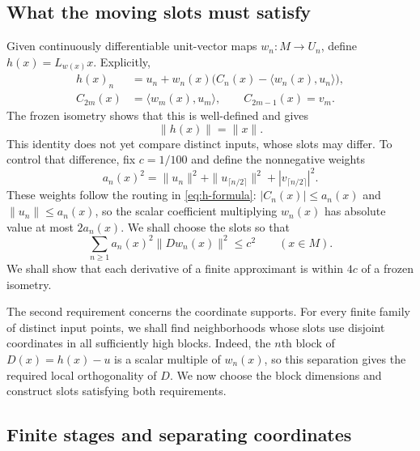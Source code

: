 \subsection{What the moving slots must satisfy}

Given continuously differentiable unit-vector maps $w_n:M\to U_n$,
define $h(x)=L_{w(x)}x$. Explicitly,
\begin{equation}
\label{eq:h-formula}
 \begin{split}
 h(x)_n&=u_n+w_n(x)\bigl(C_n(x)-\langle w_n(x),u_n\rangle\bigr),\\
 C_{2m}(x)&=\langle w_m(x),u_m\rangle,
 \qquad C_{2m-1}(x)=v_m.
 \end{split}
\end{equation}
The frozen isometry shows that this is well-defined and gives
\begin{equation}
\label{eq:pointwise-norm}
 \|h(x)\|=\|x\|.
\end{equation}
This identity does not yet compare distinct inputs, whose slots may
differ. To control that difference, fix $c=1/100$ and define the
nonnegative weights
\begin{equation}
\label{eq:weights-radii}
 a_n(x)^2=\|u_n\|^2+\|u_{\lceil n/2\rceil}\|^2
                         +|v_{\lceil n/2\rceil}|^2.
\end{equation}
These weights follow the routing in \eqref{eq:h-formula}:
$|C_n(x)|\le a_n(x)$ and $\|u_n\|\le a_n(x)$, so the scalar
coefficient multiplying $w_n(x)$ has absolute value at most $2a_n(x)$.
We shall choose the slots so that
\begin{equation}
\label{eq:slot-budget}
 \sum_{n\ge1}a_n(x)^2\|Dw_n(x)\|^2\le c^2
 \qquad(x\in M).
\end{equation}
We shall show that each derivative of a finite approximant is within
$4c$ of a frozen isometry.

The second requirement concerns the coordinate supports. For every
finite family of distinct input points, we shall find neighborhoods
whose slots use disjoint coordinates in all sufficiently high blocks.
Indeed, the $n$th block of $D(x)=h(x)-u$ is a scalar multiple of
$w_n(x)$, so this separation gives the required local orthogonality
of $D$. We now choose the block dimensions and construct slots
satisfying both requirements.

\subsection{Finite stages and separating coordinates}

